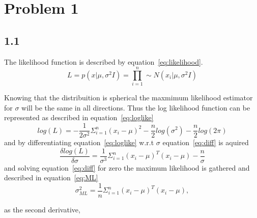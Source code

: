 \documentclass{article}
\begin{document}





\section*{Problem 1}
\subsection*{1.1}

The likelihood function is described by equation~\ref{eq:likelihood}.
\begin{equation}
L = p(x|\mu,\sigma^2I) = \prod_{i=1}^n \sim  {N}(x_i|\mu,\sigma^2I)
\label{eq:likelihood}
\end{equation}


\noindent Knowing that the distribuition is spherical the maxmimum likelihood estimator for $\sigma$ will be the same in all directions. Thus the log likelihood function can be represented as described in equation~\ref{eq:loglike}
\begin{equation}
log(L) =-\frac{1}{2\sigma^2}\Sigma_{i=1}^n(x_i-\mu)^2 - \frac{n}{2}log(\sigma^2) - \frac{n}{2}log(2\pi)
\label{eq:loglike}
\end{equation}
and by differentiating equation~\ref{eq:loglike} w.r.t $\sigma$ equation~\ref{eq:diff} is aquired
\begin{equation}
	\frac{\delta log(L)}{\delta \sigma} = \frac{1}{\sigma^3}\Sigma_{i=1}^n(x_i-\mu)^T(x_i-\mu) - \frac{n}{\sigma}
	\label{eq:diff}
\end{equation}
and solving equation~\ref{eq:diff} for zero the maximum likelihood is gathered and described in equation~\ref{eq:ML}
\begin{equation}
	\sigma_{ML}^2 = \frac{1}{n}\Sigma_{i=1}^n(x_i-\mu)^T(x_i-\mu),
	\label{eq:ML}
\end{equation}

as the second derivative,
\end{document}
